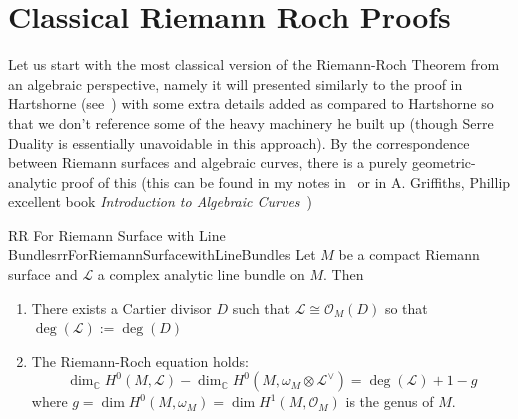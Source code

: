 \documentclass{book}
\newcommand{\C}{{\mathbb{C}}}
\newcommand{\CL}{{\mathcal{L}}}
\newcommand{\CO}{{\mathcal{O}}}
\renewcommand{\deg}{{\operatorname{deg}}}
\begin{document}
\section{Classical Riemann Roch Proofs}\label{sec:RR}

%

Let us start with the most classical version of the Riemann-Roch Theorem from an algebraic perspective, namely
it will presented similarly to the proof in Hartshorne (see~\cite{hartshorneAlgebraicGeometry2013}) with some
extra details added as compared to Hartshorne so that we don't reference some of the heavy machinery he built
up (though Serre Duality is essentially unavoidable in this approach). By the correspondence between Riemann
surfaces and algebraic curves, there is a purely geometric-analytic proof of this (this can be found in my
notes in~\cite{NateComplexAnalysis} or in A. Griffiths, Phillip excellent book \emph{Introduction to Algebraic
Curves}~\cite{a.griffithsIntroductionAlgebraicCurves})

\begin{thm}{RR For Riemann Surface with Line Bundles}{rrForRiemannSurfacewithLineBundles}
  Let $M$ be a compact Riemann surface and $\CL$ a complex analytic line bundle on $M$. Then
  \begin{enumerate}
    \item There exists a Cartier divisor $D$ such that $\CL\cong \CO_M(D)$ so that $\deg(\CL) := \deg(D)$
    \item The Riemann-Roch equation holds:
      \[
        \dim_\C H^0(M, \CL) - \dim_\C H^0(M, \omega_M\otimes \CL^\vee) = \deg(\CL) + 1-g
      \]
      where $g = \dim H^0(M, \omega_M) = \dim H^1(M, \CO_M)$ is the genus of $M$.
  \end{enumerate}
\end{thm}
\end{document}

